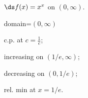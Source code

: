 {$\ds f(x) =x^x$ on $(0,\infty)$.
}
{domain=$(0,\infty)$

c.p. at $c=\frac{1}{e}$; 

increasing on $(1/e,\infty)$;

decreasing on $(0,1/e)$;

rel. min at $x=1/e$.
}
